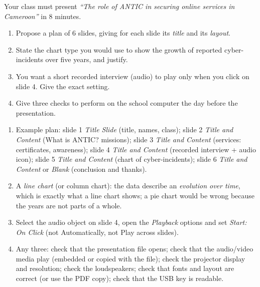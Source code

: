 \documentclass[11pt]{article}
\begin{document}
\begin{exercice}
Your class must present \emph{``The role of ANTIC in securing online services in Cameroon''} in 8 minutes.
\begin{enumerate}
\item Propose a plan of 6 slides, giving for each slide its \emph{title} and its \emph{layout}.
\item State the chart type you would use to show the growth of reported cyber-incidents over five years, and justify.
\item You want a short recorded interview (audio) to play only when you click on slide 4. Give the exact setting.
\item Give three checks to perform on the school computer the day before the presentation.
\end{enumerate}
\end{exercice}

\begin{corrige}
\begin{enumerate}
\item Example plan: slide 1 \emph{Title Slide} (title, names, class); slide 2 \emph{Title and Content} (What is ANTIC? missions); slide 3 \emph{Title and Content} (services: certificates, awareness); slide 4 \emph{Title and Content} (recorded interview + audio icon); slide 5 \emph{Title and Content} (chart of cyber-incidents); slide 6 \emph{Title and Content} or \emph{Blank} (conclusion and thanks).
\item A \emph{line chart} (or column chart): the data describe an \emph{evolution over time}, which is exactly what a line chart shows; a pie chart would be wrong because the years are not parts of a whole.
\item Select the audio object on slide 4, open the \emph{Playback} options and set \emph{Start: On Click} (not Automatically, not Play across slides).
\item Any three: check that the presentation file opens; check that the audio/video media play (embedded or copied with the file); check the projector display and resolution; check the loudspeakers; check that fonts and layout are correct (or use the PDF copy); check that the USB key is readable.
\end{enumerate}
\end{corrige}
\end{document}
